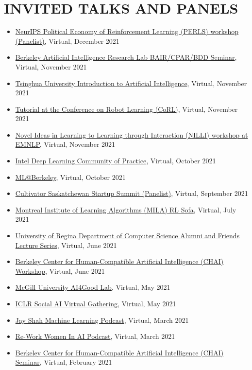 \documentclass[paper=letter,fontsize=11pt]{scrartcl} %
\newcommand{\NewPart}[2]{\section*{\uppercase{#1} #2}}
\newcommand{\TalkEntry}[4]{
        \noindent \href{#4}{#1}, #2, #3 }
\begin{document}
\NewPart{Invited Talks and Panels}{}
\begin{itemize}
\item\TalkEntry{NeurIPS Political Economy of Reinforcement Learning (PERLS) workshop (Panelist)}{Virtual}{December 2021}{}
\item\TalkEntry{Berkeley Artificial Intelligence Research Lab BAIR/CPAR/BDD Seminar}{Virtual}{November 2021}{}
\item\TalkEntry{Tsinghua University Introduction to Artificial Intelligence}{Virtual}{November 2021}{}
\item\TalkEntry{Tutorial at the Conference on Robot Learning (CoRL)}{Virtual}{November 2021}{https://youtu.be/5KjpZS4_RBs?t=27626}
\item\TalkEntry{Novel Ideas in Learning to Learning through Interaction (NILLI) workshop at EMNLP}{Virtual}{November 2021}{}
\item\TalkEntry{Intel Deep Learning Community of Practice}{Virtual}{October 2021}{https://youtu.be/TggAeE1wjVI}
\item\TalkEntry{ML@Berkeley}{Virtual}{October 2021}{}
\item\TalkEntry{Cultivator Saskatchewan Startup Summit (Panelist)}{Virtual}{September 2021}{}
\item\TalkEntry{Montreal Institute of Learning Algorithms (MILA) RL Sofa}{Virtual}{July 2021}{https://bluejeans.com/s/mw4d0UxFM_J/}
\item\TalkEntry{University of Regina Department of Computer Science Alumni and Friends Lecture Series}{Virtual}{June 2021}{https://www.uregina.ca/science/cs/events/2021/06/social-reinforcement-learning-vl.html}
\item\TalkEntry{Berkeley Center for Human-Compatible Artificial Intelligence (CHAI) Workshop}{Virtual}{June 2021}{}
\item\TalkEntry{McGill University AI4Good Lab}{Virtual}{May 2021}{https://www.ai4goodlab.com/montreal-program}
\item\TalkEntry{ICLR Social AI Virtual Gathering}{Virtual}{May 2021}{https://iclr.cc/virtual/2021/social/4423}
\item\TalkEntry{Jay Shah Machine Learning Podcast}{Virtual}{March 2021}{https://www.youtube.com/watch?v=8XpCnmvq49s}
\item\TalkEntry{Re-Work Women In AI Podcast}{Virtual}{March 2021}{https://www.youtube.com/watch?v=_gLU5Uw4TWU}
\item\TalkEntry{Berkeley Center for Human-Compatible Artificial Intelligence (CHAI) Seminar}{Virtual}{February 2021}{}

\end{itemize}
\end{document}
